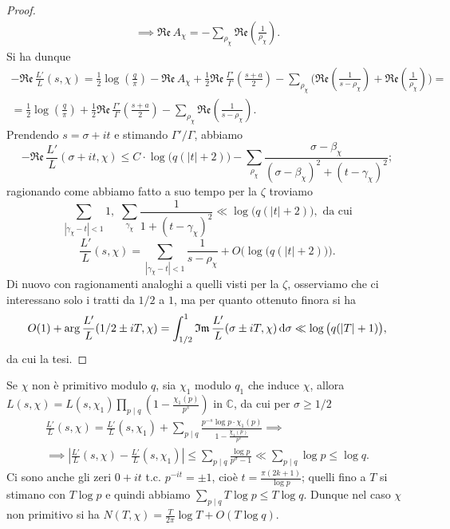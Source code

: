 \begin{proof}
\begin{gather*}
    \implies \mathfrak{Re}\,A_\chi=-\sum_{\rho_\chi} \mathfrak{Re}\left(\frac{1}{\rho_\chi}\right).
  \end{gather*}
  Si ha dunque
  \begin{gather*}
    -\mathfrak{Re}\,\frac{L'}{L}(s,\chi)=\frac{1}{2}\log\left(\frac{q}{\pi}\right)-\mathfrak{Re}\,A_\chi+\frac{1}{2}\mathfrak{Re}\,\frac{\Gamma'}{\Gamma}\left(\frac{s+a}{2}\right)-\sum_{\rho_\chi}\Bigg(\mathfrak{Re}\left(\frac{1}{s-\rho_\chi}\right)+\mathfrak{Re}\left(\frac{1}{\rho_\chi}\right)\Bigg)=\\
    =\frac{1}{2}\log\left(\frac{q}{\pi}\right)+\frac{1}{2}\mathfrak{Re}\,\frac{\Gamma'}{\Gamma}\left(\frac{s+a}{2}\right)-\sum_{\rho_\chi}\mathfrak{Re}\left(\frac{1}{s-\rho_\chi}\right).
  \end{gather*}
  Prendendo $s=\sigma+it$ e stimando $\Gamma'/\Gamma$, abbiamo
  $$-\mathfrak{Re}\,\frac{L'}{L}(\sigma+it,\chi) \le C\cdot\log\big(q(|t|+2)\big)-\sum_{\rho_\chi} \frac{\sigma-\beta_\chi}{(\sigma-\beta_\chi)^2+(t-\gamma_\chi)^2};$$
  ragionando come abbiamo fatto a suo tempo per la $\zeta$ troviamo
  $$\sum_{|\gamma_\chi-t|<1} 1, \,\, \sum_{\gamma_\chi}\frac{1}{1+(t-\gamma_\chi)^2} \ll \log\big(q(|t|+2)\big), \text{ da cui}$$
  $$\frac{L'}{L}(s,\chi)=\sum_{|\gamma_\chi-t|<1} \frac{1}{s-\rho_\chi}+O\Big(\log\big(q(|t|+2)\big)\Big).$$
  Di nuovo con ragionamenti analoghi a quelli visti per la $\zeta$, osserviamo che ci interessano solo i tratti da $1/2$ a $1$, ma per quanto ottenuto finora si ha
  $$O(1)+\arg\frac{L'}{L}(1/2 \pm iT,\chi)=\int_{1/2}^1 \mathfrak{Im}\,\frac{L'}{L}(\sigma \pm iT,\chi)\mathop{}\!\mathrm{d}\sigma \ll \log\big(q(|T|+1)\big),$$
  da cui la tesi.
\end{proof}

\begin{oss}
  Se $\chi$ non è primitivo modulo $q$, sia $\chi_1$ modulo $q_1$ che induce $\chi$, allora $\displaystyle L(s,\chi)=L(s,\chi_1)\prod_{p \mid q}\left(1-\frac{\chi_1(p)}{p^s}\right)$ in $\mathbb{C}$, da cui per $\sigma \ge 1/2$
  \begin{gather*}
    \frac{L'}{L}(s,\chi)=\frac{L'}{L}(s,\chi_1)+\sum_{p \mid q} \frac{p^{-s}\log{p}\cdot\chi_1(p)}{1-\frac{\chi_1(p)}{p^s}} \implies \\
    \implies \left|\frac{L'}{L}(s,\chi)-\frac{L'}{L}(s,\chi_1)\right| \le \sum_{p \mid q} \frac{\log{p}}{p^{\sigma}-1} \ll \sum_{p \mid q} \log{p} \le \log{q}.
  \end{gather*}
  Ci sono anche gli zeri $0+it$ t.c. $p^{-it}=\pm 1$, cioè $t=\frac{\pi(2k+1)}{\log{p}}$; quelli fino a $T$ si stimano con $T\log{p}$ e quindi abbiamo $\displaystyle \sum_{p \mid q} T\log{p} \le T\log{q}$. Dunque nel caso $\chi$ non primitivo si ha $N(T,\chi)=\frac{T}{2\pi}\log{T}+O(T\log{q})$.
\end{oss}
